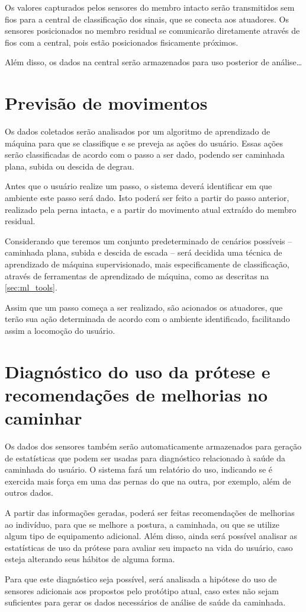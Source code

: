 Os valores capturados pelos sensores do membro intacto serão transmitidos sem fios para a central de classificação dos sinais, que se conecta aos atuadores. Os sensores posicionados no membro residual se comunicarão diretamente através de fios com a central, pois estão posicionados fisicamente próximos.

Além disso, os dados na central serão armazenados para uso posterior de análise\ldots {}

\section{Previsão de movimentos}
Os dados coletados serão analisados por um algoritmo de aprendizado de máquina para que se classifique e se preveja as ações do usuário. Essas ações serão classificadas de acordo com o passo a ser dado, podendo ser caminhada plana, subida ou descida de degrau.

Antes que o usuário realize um passo, o sistema deverá identificar em que ambiente este passo será dado. Isto poderá ser feito a partir do passo anterior, realizado pela perna intacta, e a partir do movimento atual extraído do membro residual.

Considerando que teremos um conjunto predeterminado de cenários possíveis -- caminhada plana, subida e descida de escada -- será decidida uma técnica de aprendizado de máquina supervisionado, mais especificamente de classificação, através de ferramentas de aprendizado de máquina, como as descritas na \autoref{sec:ml_tools}.

Assim que um passo começa a ser realizado, são acionados os atuadores, que terão sua ação determinada de acordo com o ambiente identificado, facilitando assim a locomoção do usuário.

\section{Diagnóstico do uso da prótese e recomendações de melhorias no caminhar}
Os dados dos sensores também serão automaticamente armazenados para geração de estatísticas que podem ser usadas para diagnóstico relacionado à saúde da caminhada do usuário. O sistema fará um relatório do uso, indicando se é exercida mais força em uma das pernas do que na outra, por exemplo, além de outros dados.

A partir das informações geradas, poderá ser feitas recomendações de melhorias ao indivíduo, para que se melhore a postura, a caminhada, ou que se utilize algum tipo de equipamento adicional. Além disso, ainda será possível analisar as estatísticas de uso da prótese para avaliar seu impacto na vida do usuário, caso esteja alterando seus hábitos de alguma forma.

Para que este diagnóstico seja possível, será analisada a hipótese do uso de sensores adicionais aos propostos pelo protótipo atual, caso estes não sejam suficientes para gerar os dados necessários de análise de saúde da caminhada.